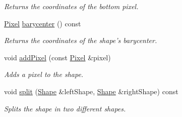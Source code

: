 \begin{CompactItemize}
\begin{CompactList}\small\item\em Returns the coordinates of the bottom pixel. \item\end{CompactList}\item 
\hyperlink{_shape_8hpp_535e59456e3e633842529cfa8ea103c4}{Pixel} \hyperlink{class_shape_a935b8870ea61569990b304b77513923}{barycenter} () const 
\begin{CompactList}\small\item\em Returns the coordinates of the shape's barycenter. \item\end{CompactList}\item 
void \hyperlink{class_shape_f6114234203d9473f1fef9e6391f9243}{addPixel} (const \hyperlink{_shape_8hpp_535e59456e3e633842529cfa8ea103c4}{Pixel} \&pixel)
\begin{CompactList}\small\item\em Adds a pixel to the shape. \item\end{CompactList}\item 
void \hyperlink{class_shape_bcb7d1626e403703952967533c9004ce}{split} (\hyperlink{class_shape}{Shape} \&leftShape, \hyperlink{class_shape}{Shape} \&rightShape) const 
\begin{CompactList}\small\item\em Splits the shape in two different shapes. \item\end{CompactList}\end{CompactItemize}
